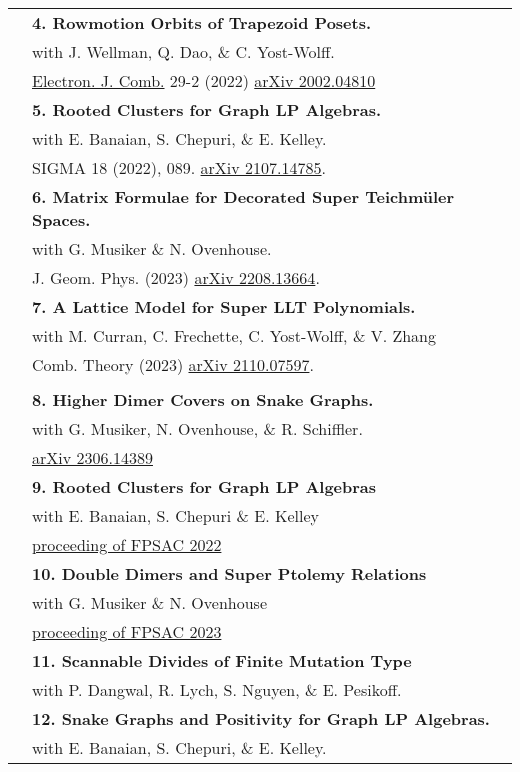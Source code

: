 \documentclass[letterpaper, 11pt,times]{article}
\newcommand{\mycolor}[0]{\color{RoyalBlue}}
\newlength{\myl}
\newcommand{\ind}[0]{\hspace{\myl}}
\newlength{\newl}
\newcommand{\paper}[2]{
\settowidth{\newl}{\textbf{#1. \ }}
\noindent
\hspace{\dimexpr\myl - \newl}
\textbf{#1. #2}
}
\begin{document}
\begin{longtable}{p{1in}p{5in}}
&\paper{4}{Rowmotion Orbits of Trapezoid Posets.}\\
&\ind  with J. Wellman, Q. Dao, \& C. Yost-Wolff.\\
&\ind   \href{https://doi.org/10.37236/9769}{Electron. J. Comb.} 29-2 (2022) \href{https://arxiv.org/abs/2002.04810}{arXiv 2002.04810}\\

&\paper{5}{Rooted Clusters for Graph LP Algebras.}\\
&\ind  with E. Banaian, S. Chepuri, \& E. Kelley.\\
&\ind SIGMA 18 (2022), 089. \href{https://arxiv.org/abs/2107.14785}{arXiv 2107.14785}. \\

&\paper{6}{Matrix Formulae for Decorated Super Teichm\"uler Spaces.} \\
&\ind  with  G. Musiker \& N. Ovenhouse. \\
&\ind  J. Geom. Phys. (2023) \href{https://arxiv.org/abs/2208.13664}{arXiv 2208.13664}. \\

&\paper{7}{A Lattice Model for Super LLT Polynomials.} \\
&\ind  with M. Curran, C. Frechette, C. Yost-Wolff, \& V. Zhang\\
&\ind  Comb. Theory (2023) \href{https://arxiv.org/abs/2110.07597}{arXiv 2110.07597}. \\

&\\

\nohyphens{\mycolor{Preprints}}
&\paper{8}{Higher Dimer Covers on Snake Graphs.}\\
&\ind  with  G. Musiker, N. Ovenhouse, \& R. Schiffler. \\
&\ind \href{https://arxiv.org/abs/2306.14389}{arXiv 2306.14389}\\

\nohyphens{\mycolor{Preceedings}}
&\paper{9}{Rooted Clusters for Graph LP Algebras}\\
&\ind  with E. Banaian, S. Chepuri \& E. Kelley\\
&\ind \href{https://www.mat.univie.ac.at/~slc/wpapers/FPSAC2022/52.pdf}{proceeding of FPSAC 2022}\\
&\paper{10}{Double Dimers and Super Ptolemy Relations}\\
&\ind  with G. Musiker \& N. Ovenhouse\\
&\ind \href{https://www.mat.univie.ac.at/~slc/wpapers/FPSAC2023/79.pdf}{proceeding of FPSAC 2023}\\
\nohyphens{\mycolor{In Preparation}}
&\paper{11}{Scannable Divides of Finite Mutation Type}\\
&\ind  with P. Dangwal, R. Lych, S. Nguyen, \& E. Pesikoff.\\
&\paper{12}{Snake Graphs and Positivity for Graph LP Algebras.}\\
&\ind   with E. Banaian, S. Chepuri, \& E. Kelley.\\


\end{longtable}
\end{document}
